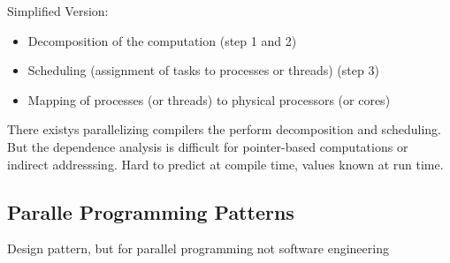 \documentclass{article}
\begin{document}
Simplified Version:
\begin{itemize}
    \item Decomposition of the computation (step 1 and 2)
    \item Scheduling (assignment of tasks to processes or threads) (step 3)
    \item Mapping of processes (or threads) to physical processors (or cores)
\end{itemize}
There existys parallelizing compilers the perform decomposition and scheduling.
But the dependence analysis is difficult for pointer-based computations or indirect addresssing.
Hard to predict at compile time, values known at run time.

\subsection{Paralle Programming Patterns}
Design pattern, but for parallel programming not software engineering
\end{document}
